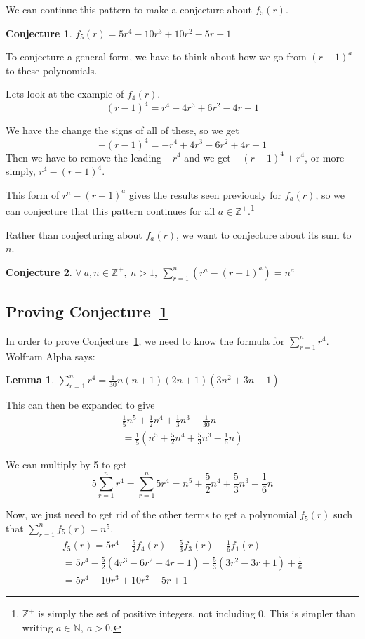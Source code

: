 \documentclass[a4paper]{article}
\newcommand{\sn}{\sum\limits_{r=1}^{n}}
\newcommand{\inn}{\in \mathbb{N}}
\newcommand{\oo}[1]{\frac{1}{#1}}
\newcommand{\zp}{\mathbb{Z}^+}
\newtheorem{lemma}{Lemma}
\newtheorem{conjecture}{Conjecture}
\begin{document}
We can continue this pattern to make a conjecture about $f_5(r)$.
\begin{conjecture}
$f_5(r) = 5r^4 - 10r^3 + 10r^2 - 5r + 1$
\label{conj:f5}
\end{conjecture}

To conjecture a general form, we have to think about how we go from $(r-1)^a$ to these polynomials.

Lets look at the example of $f_4(r)$. $$(r-1)^4 = r^4 - 4r^3 + 6r^2 - 4r + 1$$

We have the change the signs of all of these, so we get $$-(r-1)^4 = -r^4 + 4r^3 - 6r^2 + 4r - 1$$ Then we have to remove the leading $-r^4$ and we get $-(r-1)^4 + r^4$, or more simply, $r^4 - (r-1)^4$.

This form of $r^a - (r-1)^a$ gives the results seen previously for $f_a(r)$, so we can conjecture that this pattern continues for all $a \in \zp$.\footnote{$\zp$ is simply the set of positive integers, not including 0. This is simpler than writing $a \inn,\ a > 0$.}

Rather than conjecturing about $f_a(r)$, we want to conjecture about its sum to $n$.
\begin{conjecture}
$\displaystyle \forall\ a, n \in \zp,\ n > 1,\ \sn \left(r^a - (r - 1)^a\right) = n^a$
\label{conj:fa_sum}
\end{conjecture}

\subsection{Proving Conjecture~\ref{conj:f5}}

In order to prove Conjecture~\ref{conj:f5}, we need to know the formula for $\sn r^4$. Wolfram Alpha says:

\begin{lemma}
$\displaystyle \sn r^4 = \oo{30}n(n + 1)(2n + 1)\left(3n^2 + 3n - 1\right)$
\label{lem:sum_r4}
\end{lemma}

This can then be expanded to give
\begin{gather*}
\oo{5}n^5 + \oo{2}n^4 + \oo{3}n^3 - \oo{30}n\\[0.5em]
= \oo{5}\left(n^5 + \frac{5}{2}n^4 + \frac{5}{3}n^3 - \oo{6}n\right)
\end{gather*}

We can multiply by 5 to get $$5 \sn r^4 = \sn 5r^4 = n^5 + \frac{5}{2}n^4 + \frac{5}{3}n^3 - \oo{6}n$$

Now, we just need to get rid of the other terms to get a polynomial $f_5(r)$ such that $\sn f_5(r) = n^5$.
\begin{gather*}
f_5(r) = 5r^4 - \frac{5}{2}f_4(r) - \frac{5}{3}f_3(r) + \oo{6}f_1(r)\\[0.5em]
= 5r^4 - \frac{5}{2}\left(4r^3 - 6r^2 + 4r - 1\right) - \frac{5}{3}\left(3r^2 - 3r + 1\right) + \oo{6}\\[0.5em]
= 5r^4 - 10r^3 + 10r^2 - 5r + 1
\end{gather*}
\end{document}
